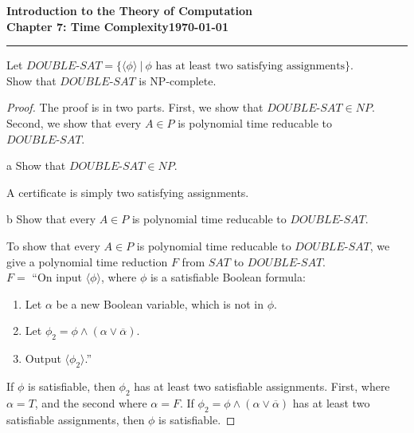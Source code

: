 \documentclass[11pt]{article}
\newcommand{\dated}{\today}
\begin{document}
\textbf{Introduction to the Theory of
Computation}\hfill\textbf{\myname}\\[0.01in]
\textbf{Chapter 7: Time Complexity}\hfill\textbf{\dated}\\
\smallskip\hrule\bigskip

\begin{problem}{7.22}
Let $DOUBLE\text{-}SAT = \{\langle \phi \rangle \ | \ \phi \text{ has at least two satisfying assignments}\}$. \\ Show that $DOUBLE\text{-}SAT$ is NP-complete.
\end{problem}

\begin{proof}
The proof is in two parts. First, we show that $DOUBLE\text{-}SAT \in NP$. Second, we show that every $A \in P$ is polynomial time reducable to $DOUBLE\text{-}SAT$.

\begin{problem}[Part]{a}
Show that $DOUBLE\text{-}SAT \in NP$.
\end{problem}

A certificate is simply two satisfying assignments.

\begin{problem}[Part]{b}
Show that every $A \in P$ is polynomial time reducable to $DOUBLE\text{-}SAT$.
\end{problem}

To show that every $A \in P$ is polynomial time reducable to $DOUBLE\text{-}SAT$, we give a polynomial time reduction $F$ from $SAT$ to $DOUBLE\text{-}SAT$. \\

$F =$ \textquotedblleft On input $\langle \phi \rangle$, where $\phi$ is a satisfiable Boolean formula:
\begin{enumerate}
\item Let $\alpha$ be a new Boolean variable, which is not in $\phi$.
\item Let $\phi_2 = \phi \wedge (\alpha \vee \overline{\alpha})$.
\item Output $\langle \phi_2 \rangle$.\textquotedblright
\end{enumerate}
If $\phi$ is satisfiable, then $\phi_2$ has at least two satisfiable assignments. First, where $\alpha = T$, and the second where $\alpha = F$. If $\phi_2 = \phi \wedge (\alpha \vee \overline{\alpha})$ has at least two satisfiable assignments, then $\phi$ is satisfiable.
\end{proof}
\end{document}

